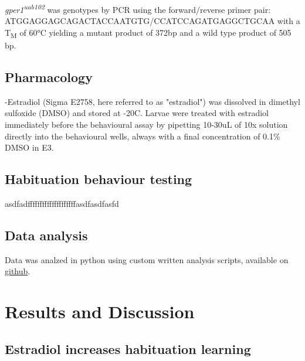 \documentclass[9pt,lineno]{RandlettLab_elife}
\begin{document}
\emph{gper1\textsuperscript{uab102}} was genotypes by PCR using the forward/reverse primer pair:
\\ \mbox{ATGGAGGAGCAGACTACCAATGTG/CCATCCAGATGAGGCTGCAA} with a T\textsubscript{M} of 60°C yielding a mutant product of 372bp and a wild type product of 505 bp.


\subsection{Pharmacology}

\textbeta-Estradiol (Sigma E2758, here referred to as "estradiol") was dissolved in dimethyl sulfoxide (DMSO) and stored at -20\degree C. 
Larvae were treated with estradiol immediately before the behavioural assay by pipetting 10-30uL of 10x solution directly into the behavioural wells, always with a final concentration of 0.1\% DMSO in E3.

\subsection{Habituation behaviour testing}

asdfadffffffffffffffffffffasdfasdfasfd

\subsection{Data analysis}

Data was analzed in python using custom written analysis scripts, available on \href{https://github.com/owenrandlett/2025\_HabEstrogen}{github}. 

\newpage
\section{Results and Discussion}

\subsection{Estradiol increases habituation learning}
\end{document}
